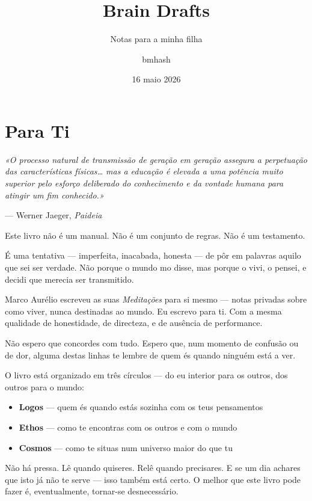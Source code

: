 \documentclass[
  11pt,
  a5paper,
]{book}
\title{Brain Drafts}
\subtitle{Notas para a minha filha}
\author{bmhash}
\date{16 maio 2026}
\providecommand{\tightlist}{%
  \setlength{\itemsep}{0pt}\setlength{\parskip}{0pt}}\usepackage{longtable,booktabs,array}
\renewcommand*\contentsname{Índice}
\newcommand\contentsname{Índice}
\begin{document}
\frontmatter
\maketitle

\renewcommand*\contentsname{Índice}
{
\setcounter{tocdepth}{2}
\tableofcontents
}

\mainmatter
{}

\chapter{Para Ti}\label{para-ti}

\emph{«O processo natural de transmissão de geração em geração assegura
a perpetuação das características físicas\ldots{} mas a educação é
elevada a uma potência muito superior pelo esforço deliberado do
conhecimento e da vontade humana para atingir um fim conhecido.»}

--- Werner Jaeger, \emph{Paideia}

Este livro não é um manual. Não é um conjunto de regras. Não é um
testamento.

É uma tentativa --- imperfeita, inacabada, honesta --- de pôr em
palavras aquilo que sei ser verdade. Não porque o mundo mo disse, mas
porque o vivi, o pensei, e decidi que merecia ser transmitido.

Marco Aurélio escreveu as suas \emph{Meditações} para si mesmo --- notas
privadas sobre como viver, nunca destinadas ao mundo. Eu escrevo para
ti. Com a mesma qualidade de honestidade, de directeza, e de ausência de
performance.

Não espero que concordes com tudo. Espero que, num momento de confusão
ou de dor, alguma destas linhas te lembre de quem és quando ninguém está
a ver.

O livro está organizado em três círculos --- do eu interior para os
outros, dos outros para o mundo:

\begin{itemize}
\tightlist
\item
  \textbf{Logos} --- quem és quando estás sozinha com os teus
  pensamentos
\item
  \textbf{Ethos} --- como te encontras com os outros e com o mundo
\item
  \textbf{Cosmos} --- como te situas num universo maior do que tu
\end{itemize}

Não há pressa. Lê quando quiseres. Relê quando precisares. E se um dia
achares que isto já não te serve --- isso também está certo. O melhor
que este livro pode fazer é, eventualmente, tornar-se desnecessário.
\end{document}

